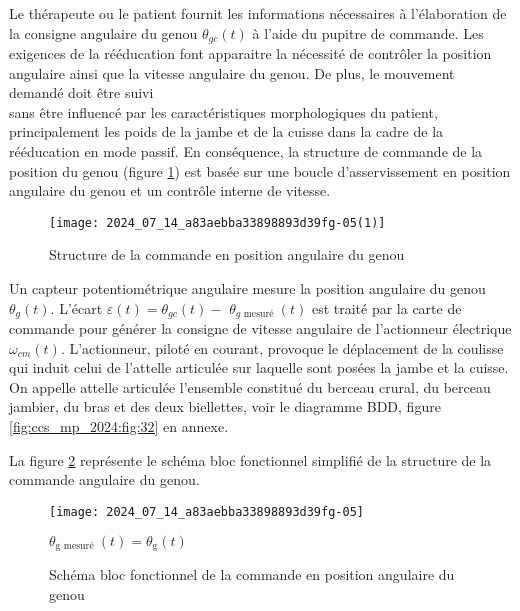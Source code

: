 Le thérapeute ou le patient fournit les informations nécessaires à l'élaboration de la consigne angulaire du genou $\theta_{g c}(t)$ à l'aide du pupitre de commande. Les exigences de la rééducation font apparaitre la nécessité de contrôler la position angulaire ainsi que la vitesse angulaire du genou. De plus, le mouvement demandé doit être suivi\\
sans être influencé par les caractéristiques morphologiques du patient, principalement les poids de la jambe et de la cuisse dans la cadre de la rééducation en mode passif. En conséquence, la structure de commande de la position du genou (figure \ref{fig:ccs_mp_2024:fig:07}) est basée sur une boucle d'asservissement en position angulaire du genou et un contrôle interne de vitesse.

\begin{figure}[!h]
\centering
\texttt{[image: 2024\_07\_14\_a83aebba33898893d39fg-05(1)]}
\caption{\label{fig:ccs_mp_2024:fig:07}Structure de la commande en position angulaire du genou}
\end{figure}
Un capteur potentiométrique angulaire mesure la position angulaire du genou $\theta_{g}(t)$. L'écart $\varepsilon(t)=\theta_{g c}(t)-$ $\theta_{g \text { mesuré }}(t)$ est traité par la carte de commande pour générer la consigne de vitesse angulaire de l'actionneur électrique $\omega_{c m}(t)$. L'actionneur, piloté en courant, provoque le déplacement de la coulisse qui induit celui de l'attelle articulée sur laquelle sont posées la jambe et la cuisse. On appelle attelle articulée l'ensemble constitué du berceau crural, du berceau jambier, du bras et des deux biellettes, voir le diagramme BDD, figure \ref{fig:ccs_mp_2024:fig:32} en annexe.


La figure \ref{fig:ccs_mp_2024:fig:08} représente le schéma bloc fonctionnel simplifié de la structure de la commande angulaire du genou.

\begin{figure}[!h]\centering
\texttt{[image: 2024\_07\_14\_a83aebba33898893d39fg-05]}

$\theta_{\mathrm{g} \text { mesuré }}(t)=\theta_{\mathrm{g}}(t)$

\caption{\label{fig:ccs_mp_2024:fig:08}Schéma bloc fonctionnel de la commande en position angulaire du genou}
\end{figure}

